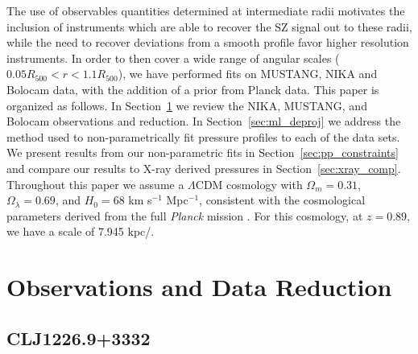 \documentclass[twocolumn,traditabstract]{aa}
\begin{document}
The use of observables quantities determined at intermediate radii motivates the inclusion of instruments which are able
to recover the SZ signal out to these radii, while the need to recover deviations from a smooth profile favor higher
resolution instruments. In order to then cover a wide range of angular scales ($0.05 R_{500} < r < 1.1 R_{500}$), we have
performed fits on MUSTANG, NIKA and Bolocam data, with the addition of a prior from Planck data.
This paper is organized as follows. In Section~\ref{sec:obs} we review the NIKA, MUSTANG, and Bolocam observations and reduction. 
In Section~\ref{sec:ml_deproj} we address the method used to non-parametrically fit pressure profiles to each of the data sets.
We present results from our non-parametric fits in Section~\ref{sec:pp_constraints} and compare our results to X-ray derived pressures 
in Section~\ref{sec:xray_comp}. 
Throughout this paper we assume a $\Lambda$CDM cosmology with $\Omega_m = 0.31$, $\Omega_{\lambda} = 0.69$, and $H_0 = 68$ 
km s$^{-1}$ Mpc$^{-1}$, consistent with the cosmological parameters derived from the full \emph{Planck} mission
\citep{planck2016_cp}. For this cosmology, at $z=0.89$, we have a scale of 7.945 kpc/\asec.

\section{Observations and Data Reduction}
\label{sec:obs}

\subsection{CLJ1226.9+3332}
\label{sec:sample_clj1227}
\end{document}
